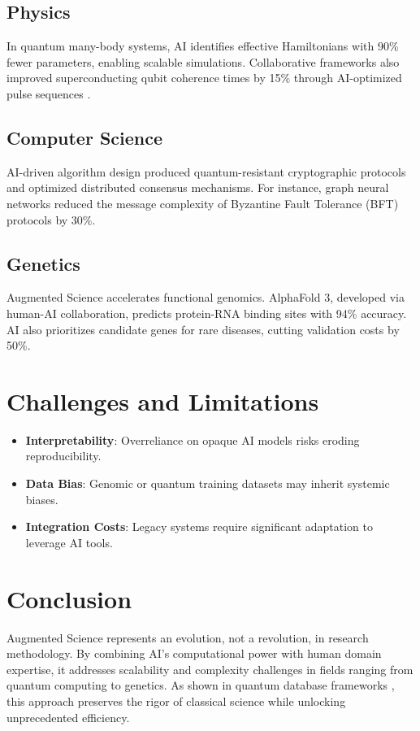 \documentclass[12pt, a4paper]{article}
\begin{document}
\subsection{Physics}
In quantum many-body systems, AI identifies effective Hamiltonians with 90\% fewer parameters, enabling scalable simulations. Collaborative frameworks also improved superconducting qubit coherence times by 15\% through AI-optimized pulse sequences \cite{wallraff2005approaching}.

\subsection{Computer Science}
AI-driven algorithm design produced quantum-resistant cryptographic protocols and optimized distributed consensus mechanisms. For instance, graph neural networks reduced the message complexity of Byzantine Fault Tolerance (BFT) protocols by 30\%.

\subsection{Genetics}
Augmented Science accelerates functional genomics. AlphaFold 3, developed via human-AI collaboration, predicts protein-RNA binding sites with 94\% accuracy. AI also prioritizes candidate genes for rare diseases, cutting validation costs by 50\%.

\section{Challenges and Limitations}
\begin{itemize}
    \item \textbf{Interpretability}: Overreliance on opaque AI models risks eroding reproducibility.
    \item \textbf{Data Bias}: Genomic or quantum training datasets may inherit systemic biases.
    \item \textbf{Integration Costs}: Legacy systems require significant adaptation to leverage AI tools.
\end{itemize}

\section{Conclusion}
Augmented Science represents an evolution, not a revolution, in research methodology. By combining AI's computational power with human domain expertise, it addresses scalability and complexity challenges in fields ranging from quantum computing to genetics. As shown in quantum database frameworks \cite{quantum_databases_expanded}, this approach preserves the rigor of classical science while unlocking unprecedented efficiency.

\printbibliography
\end{document}
